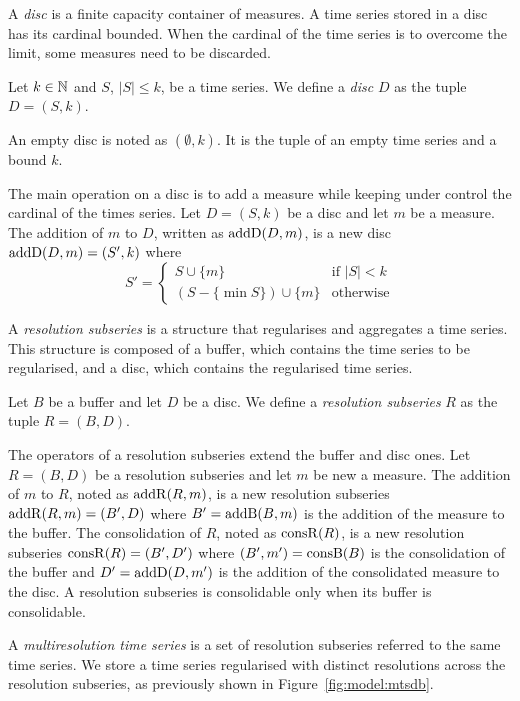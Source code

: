 A \emph{disc} is a finite capacity container of measures. A time
series stored in a disc has its cardinal bounded. When the cardinal of
the time series is to overcome the limit, some measures need to be
discarded.

\begin{definition}[Disc]
  Let $k\in\mathbb{N}$ and $S$, $|S|\leq k$, be a time series. We define a
  \emph{disc} $D$ as the tuple $D=(S,k)$.
\end{definition}

An empty disc is noted as $(\emptyset,k)$. It is the tuple of an empty
time series and a bound $k$.

The main operation on a disc is to add a measure while keeping under
control the cardinal of the times series. Let $D=(S,k)$ be a disc and
let $m$ be a measure.  The addition of $m$ to $D$, written as
$\operatorname{addD}(D,m)$, is a new disc $\operatorname{addD}(D,m)=(S',k)$ where
\[
S' = \begin{cases}
  S\cup\{m\}                 & \text{if } |S|<k  \\
  (S-\{\min S\}) \cup \{m\} & \text{otherwise}
\end{cases}  
\]

A \emph{resolution subseries} is a structure that regularises and
aggregates a time series. This structure is composed of a buffer,
which contains the time series to be regularised, and a disc, which
contains the regularised time series.

\begin{definition}
  Let $B$ be a buffer and let $D$ be a disc.  We define a
  \emph{resolution subseries} $R$ as the tuple $R=(B,D)$.
\end{definition}
 
The operators of a resolution subseries extend the buffer and disc
ones. Let $R=(B,D)$ be a resolution subseries and let $m$ be new a
measure.  The addition of $m$ to $R$, noted as $\operatorname{addR}(R,m)$, is a new
resolution subseries $\operatorname{addR}(R,m)=(B',D)$ where $B'= \operatorname{addB}(B,m)$ is the
addition of the measure to the buffer.  The consolidation of $R$,
noted as $\operatorname{consR}(R)$, is a new resolution subseries
$\operatorname{consR}(R)=(B',D')$ where $(B',m') = \operatorname{consB}(B)$ is the consolidation
of the buffer and $D'= \operatorname{addD}(D,m')$ is the addition of the
consolidated measure to the disc. A resolution subseries is
consolidable only when its buffer is consolidable.

A \emph{multiresolution time series} is a set of resolution subseries
referred to the same time series. We store a time series regularised
with distinct resolutions across the resolution subseries, as
previously shown in Figure~\ref{fig:model:mtsdb}.

